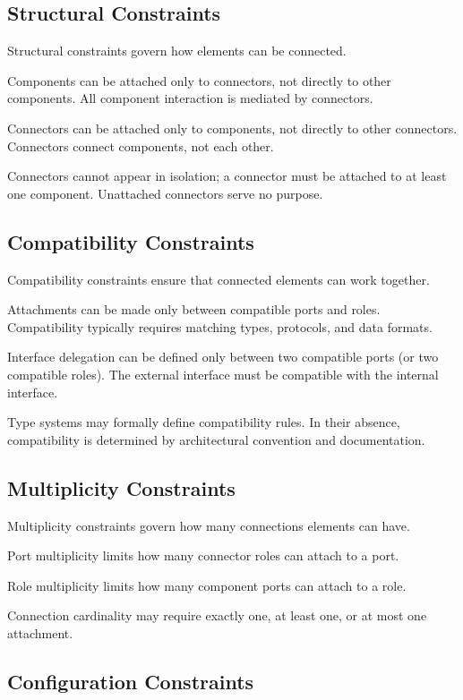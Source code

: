 \documentclass[11pt]{article}
\begin{document}
\subsection{Structural Constraints}

Structural constraints govern how elements can be connected.

Components can be attached only to connectors, not directly to other components. All component interaction is mediated by connectors.

Connectors can be attached only to components, not directly to other connectors. Connectors connect components, not each other.

Connectors cannot appear in isolation; a connector must be attached to at least one component. Unattached connectors serve no purpose.

\subsection{Compatibility Constraints}

Compatibility constraints ensure that connected elements can work together.

Attachments can be made only between compatible ports and roles. Compatibility typically requires matching types, protocols, and data formats.

Interface delegation can be defined only between two compatible ports (or two compatible roles). The external interface must be compatible with the internal interface.

Type systems may formally define compatibility rules. In their absence, compatibility is determined by architectural convention and documentation.

\subsection{Multiplicity Constraints}

Multiplicity constraints govern how many connections elements can have.

Port multiplicity limits how many connector roles can attach to a port.

Role multiplicity limits how many component ports can attach to a role.

Connection cardinality may require exactly one, at least one, or at most one attachment.

\subsection{Configuration Constraints}
\end{document}
